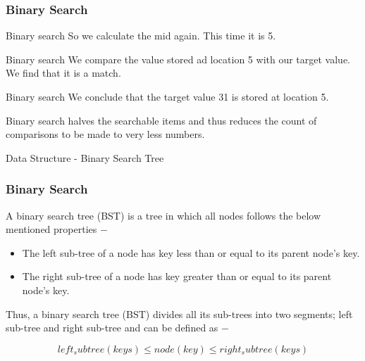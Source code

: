 \documentclass[algocomplexity.tex]{subfiles}
\begin{document}
\begin{frame}
	\frametitle{Binary Search}
	\large
	Binary search
	So we calculate the mid again. This time it is 5.
	
	Binary search
	We compare the value stored ad location 5 with our target value. We find that it is a match.
	
	Binary search
	We conclude that the target value 31 is stored at location 5.
	
	Binary search halves the searchable items and thus reduces the count of comparisons to be made to very less numbers.
\end{frame}
%
%
%
%   
%   
%      
%         
%
%
%   
\begin{frame}
	
	Data Structure - Binary Search Tree
	
\end{frame}
\begin{frame}
	\frametitle{Binary Search}
	\large
	A binary search tree (BST) is a tree in which all nodes follows the below mentioned properties −
	
	\begin{itemize}
		\item The left sub-tree of a node has key less than or equal to its parent node's key.
		\item The right sub-tree of a node has key greater than or equal to its parent node's key.
	\end{itemize}
	Thus, a binary search tree (BST) divides all its sub-trees into two segments; left sub-tree and right sub-tree and can be defined as −
	
	\[left_subtree (keys)  \leq  node (key)  \leq  right_subtree (keys)\]
\end{frame}
\end{document}
